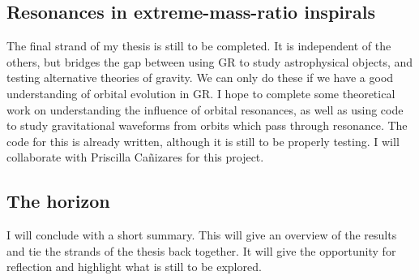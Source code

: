 \documentclass[a4paper, 11pt, twoside]{article}
\begin{document}
\subsection{Resonances in extreme-mass-ratio inspirals}

The final strand of my thesis is still to be completed. It is independent of the others, but bridges the gap between using GR to study astrophysical objects, and testing alternative theories of gravity. We can only do these if we have a good understanding of orbital evolution in GR. I hope to complete some theoretical work on understanding the influence of orbital resonances, as well as using code to study gravitational waveforms from orbits which pass through resonance. The code for this is already written, although it is still to be properly testing. I will collaborate with Priscilla Ca\~{n}izares for this project.

\subsection{The horizon}

I will conclude with a short summary. This will give an overview of the results and tie the strands of the thesis back together. It will give the opportunity for reflection and highlight what is still to be explored.



\end{document}
